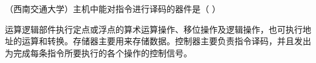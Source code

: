 \question （西南交通大学）主机中能对指令进行译码的器件是（ ）
\par{}
\begin{solution}运算逻辑部件执行定点或浮点的算术运算操作、移位操作及逻辑操作，也可执行地址的运算和转换。存储器主要用来存储数据。控制器主要负责指令译码，并且发出为完成每条指令所要执行的各个操作的控制信号。
\end{solution}
